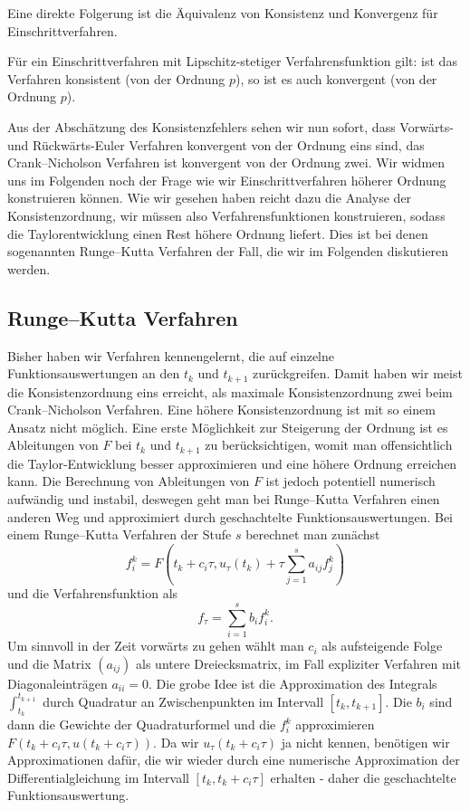 Eine direkte Folgerung ist die Äquivalenz von Konsistenz und Konvergenz für Einschrittverfahren.
%
\begin{corollary}{}{}
Für ein Einschrittverfahren mit Lipschitz-stetiger Verfahrensfunktion gilt: ist das Verfahren konsistent (von der Ordnung $p$), so ist es auch konvergent (von der Ordnung $p$).
\end{corollary}
%
Aus der Abschätzung des Konsistenzfehlers sehen wir nun sofort, dass Vorwärts- und Rückwärts-Euler Verfahren konvergent von der Ordnung eins sind, das Crank--Nicholson Verfahren ist konvergent von der Ordnung zwei. Wir widmen uns im Folgenden noch der Frage wie wir Einschrittverfahren höherer Ordnung konstruieren können. Wie wir gesehen haben reicht dazu die Analyse der Konsistenzordnung, wir müssen also Verfahrensfunktionen konstruieren, sodass die Taylorentwicklung einen Rest höhere Ordnung liefert. Dies ist bei denen sogenannten Runge--Kutta Verfahren der Fall, die wir im Folgenden diskutieren werden.
%
\subsection{Runge--Kutta Verfahren}

Bisher haben wir Verfahren kennengelernt, die auf einzelne Funktionsauswertungen an den $t_k$ und $t_{k+1}$ zurückgreifen. Damit haben wir meist die Konsistenzordnung eins erreicht, als maximale Konsistenzordnung zwei beim Crank--Nicholson Verfahren. Eine höhere Konsistenzordnung ist mit so einem Ansatz nicht möglich. Eine erste Möglichkeit zur Steigerung der Ordnung ist es Ableitungen von $F$ bei $t_k$ und $t_{k+1}$ zu berücksichtigen, womit man offensichtlich die Taylor-Entwicklung besser approximieren und eine höhere Ordnung erreichen kann. Die Berechnung von Ableitungen von $F$ ist jedoch potentiell numerisch aufwändig und instabil, deswegen geht man bei Runge--Kutta Verfahren einen anderen Weg und approximiert durch geschachtelte Funktionsauswertungen. Bei einem Runge--Kutta Verfahren der Stufe $s$ berechnet man zunächst
$$ f_i^k =  F(t_k + c_i \tau, u_\tau(t_k) + \tau \sum_{j=1}^s a_{ij} f_j^k) $$ 
und die Verfahrensfunktion als 
$$ f_\tau = \sum_{i=1}^s b_i f_i^k. $$
Um sinnvoll in der Zeit vorwärts zu gehen wählt man $c_i$ als aufsteigende Folge und die Matrix $(a_{ij})$ als untere Dreiecksmatrix, im Fall expliziter Verfahren mit Diagonaleinträgen $a_{ii}=0$. Die grobe Idee ist die Approximation des Integrals $\int_{t_k}^{t_{k+1}}$ durch Quadratur an Zwischenpunkten im Intervall $[t_k,t_{k+1}]$. Die $b_i$ sind dann die Gewichte der Quadraturformel und die $f_i^k$ approximieren $F(t_k+c_i\tau,u(t_k + c_i\tau))$. Da wir $u_\tau(t_k+c_i \tau)$ ja nicht kennen, benötigen wir Approximationen dafür, die wir wieder durch eine numerische Approximation der Differentialgleichung im Intervall $[t_k,t_k+c_i\tau]$ erhalten - daher die geschachtelte Funktionsauswertung.

